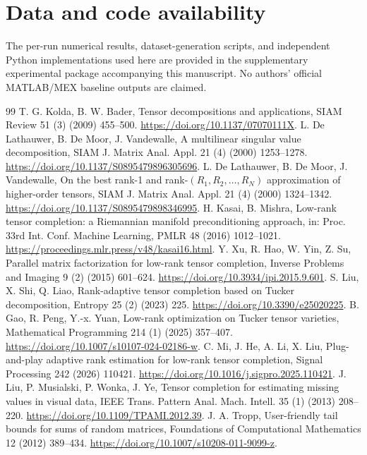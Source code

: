 \documentclass[review,10pt]{elsarticle}
\begin{document}
\section*{Data and code availability}
The per-run numerical results, dataset-generation scripts, and independent Python implementations used here are provided in the supplementary experimental package accompanying this manuscript. No authors' official MATLAB/MEX baseline outputs are claimed.

\begin{thebibliography}{99}
T. G. Kolda, B. W. Bader, Tensor decompositions and applications, SIAM Review 51 (3) (2009) 455--500. \url{https://doi.org/10.1137/07070111X}.
L. De Lathauwer, B. De Moor, J. Vandewalle, A multilinear singular value decomposition, SIAM J. Matrix Anal. Appl. 21 (4) (2000) 1253--1278. \url{https://doi.org/10.1137/S0895479896305696}.
L. De Lathauwer, B. De Moor, J. Vandewalle, On the best rank-1 and rank-$(R_1,R_2,\ldots,R_N)$ approximation of higher-order tensors, SIAM J. Matrix Anal. Appl. 21 (4) (2000) 1324--1342. \url{https://doi.org/10.1137/S0895479898346995}.
H. Kasai, B. Mishra, Low-rank tensor completion: a Riemannian manifold preconditioning approach, in: Proc. 33rd Int. Conf. Machine Learning, PMLR 48 (2016) 1012--1021. \url{https://proceedings.mlr.press/v48/kasai16.html}.
Y. Xu, R. Hao, W. Yin, Z. Su, Parallel matrix factorization for low-rank tensor completion, Inverse Problems and Imaging 9 (2) (2015) 601--624. \url{https://doi.org/10.3934/ipi.2015.9.601}.
S. Liu, X. Shi, Q. Liao, Rank-adaptive tensor completion based on Tucker decomposition, Entropy 25 (2) (2023) 225. \url{https://doi.org/10.3390/e25020225}.
B. Gao, R. Peng, Y.-x. Yuan, Low-rank optimization on Tucker tensor varieties, Mathematical Programming 214 (1) (2025) 357--407. \url{https://doi.org/10.1007/s10107-024-02186-w}.
C. Mi, J. He, A. Li, X. Liu, Plug-and-play adaptive rank estimation for low-rank tensor completion, Signal Processing 242 (2026) 110421. \url{https://doi.org/10.1016/j.sigpro.2025.110421}.
J. Liu, P. Musialski, P. Wonka, J. Ye, Tensor completion for estimating missing values in visual data, IEEE Trans. Pattern Anal. Mach. Intell. 35 (1) (2013) 208--220. \url{https://doi.org/10.1109/TPAMI.2012.39}.
J. A. Tropp, User-friendly tail bounds for sums of random matrices, Foundations of Computational Mathematics 12 (2012) 389--434. \url{https://doi.org/10.1007/s10208-011-9099-z}.
\end{thebibliography}
\end{document}
